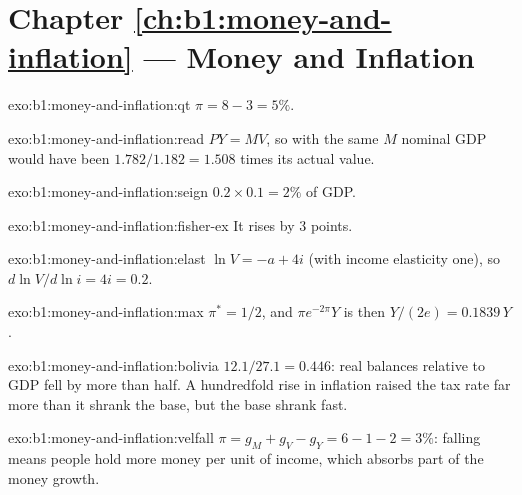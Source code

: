 \section*{Chapter \ref{ch:b1:money-and-inflation} --- Money and Inflation}

\begin{solution}{exo:b1:money-and-inflation:qt}
$\pi = 8 - 3 = 5\%$.
\end{solution}

\begin{solution}{exo:b1:money-and-inflation:read}
$PY = MV$, so with the same $M$ nominal GDP would have been $1.782/1.182 = 1.508$ times
its actual value.
\end{solution}

\begin{solution}{exo:b1:money-and-inflation:seign}
$0.2 \times 0.1 = 2\%$ of GDP.
\end{solution}

\begin{solution}{exo:b1:money-and-inflation:fisher-ex}
It rises by 3 points.
\end{solution}

\begin{solution}{exo:b1:money-and-inflation:elast}
$\ln V = -a + 4i$ (with income elasticity one), so $d\ln V/d\ln i = 4i = 0.2$.
\end{solution}

\begin{solution}{exo:b1:money-and-inflation:max}
$\pi^* = 1/2$, and  $\pi e^{-2\pi}Y$ is then $Y/(2e) = 0.1839\,Y$.
\end{solution}

\begin{solution}{exo:b1:money-and-inflation:bolivia}
$12.1/27.1 = 0.446$: real balances relative to GDP fell by more than half.
A hundredfold rise in inflation raised the tax rate far more than it shrank
the base, but the base shrank fast.
\end{solution}

\begin{solution}{exo:b1:money-and-inflation:velfall}
$\pi = g_M + g_V - g_Y = 6 - 1 - 2 = 3\%$: falling  means people hold more money
per unit of income, which absorbs part of the money growth.
\end{solution}

